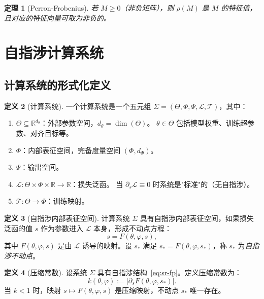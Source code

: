 \documentclass[12pt,a4paper]{article}
\newtheorem{theorem}{定理}[section]
\theoremstyle{definition}
\newtheorem{definition}[theorem]{定义}
\newcommand{\mL}{\mathcal{L}}
\newcommand{\mT}{\mathcal{T}}
\newcommand{\mPhi}{\Phi}
\newcommand{\mPsi}{\Psi}
\newcommand{\mTheta}{\Theta}
\newcommand{\R}{\mathbb{R}}
\begin{document}
\begin{theorem}[Perron-Frobenius]
若 $M \geq 0$（非负矩阵），则 $\rho(M)$ 是 $M$ 的特征值，且对应的特征向量可取为非负的。
\end{theorem}

\section{自指涉计算系统}
\label{sec:sr-system}

\subsection{计算系统的形式化定义}

\begin{definition}[计算系统]
\label{def:cs}
一个计算系统是一个五元组 $\Sigma = (\mTheta, \mPhi, \mPsi, \mL, \mT)$，其中：
\begin{enumerate}[label=(\roman*)]
\item $\mTheta \subseteq \R^{d_\theta}$：外部参数空间，$d_\theta = \dim(\mTheta)$。
      $\theta \in \mTheta$ 包括模型权重、训练超参数、对齐目标等。
\item $\mPhi$：内部表征空间，完备度量空间 $(\mPhi, d_\mPhi)$。
\item $\mPsi$：输出空间。
\item $\mL: \mTheta \times \mPhi \times \R \to \R$：损失泛函。
      当 $\partial_s \mL \equiv 0$ 时系统是"标准"的（无自指涉）。
\item $\mT: \mTheta \to \mPhi$：训练映射。
\end{enumerate}
\end{definition}

\begin{definition}[自指涉内部表征空间]
\label{def:sr}
计算系统 $\Sigma$ 具有自指涉内部表征空间，如果损失泛函的值 $s$ 作为参数进入 $\mL$ 本身，形成不动点方程：
\begin{equation}
\label{eq:sr-fp}
s = F(\theta, \varphi, s),
\end{equation}
其中 $F(\theta, \varphi, s)$ 是由 $\mL$ 诱导的映射。设 $s_*$ 满足 $s_* = F(\theta, \varphi, s_*)$，称 $s_*$ 为\emph{自指涉不动点}。
\end{definition}

\begin{definition}[压缩常数]
\label{def:k}
设系统 $\Sigma$ 具有自指涉结构~\eqref{eq:sr-fp}。定义压缩常数为：
\begin{equation}
\label{eq:k}
k(\theta, \varphi) := |\partial_s F(\theta, \varphi, s_*)|.
\end{equation}
当 $k < 1$ 时，映射 $s \mapsto F(\theta, \varphi, s)$ 是压缩映射，不动点 $s_*$ 唯一存在。
\end{definition}
\end{document}
